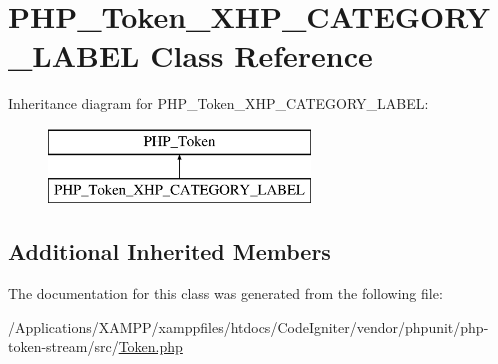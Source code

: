 \hypertarget{class_p_h_p___token___x_h_p___c_a_t_e_g_o_r_y___l_a_b_e_l}{}\section{P\+H\+P\+\_\+\+Token\+\_\+\+X\+H\+P\+\_\+\+C\+A\+T\+E\+G\+O\+R\+Y\+\_\+\+L\+A\+B\+EL Class Reference}
\label{class_p_h_p___token___x_h_p___c_a_t_e_g_o_r_y___l_a_b_e_l}
Inheritance diagram for P\+H\+P\+\_\+\+Token\+\_\+\+X\+H\+P\+\_\+\+C\+A\+T\+E\+G\+O\+R\+Y\+\_\+\+L\+A\+B\+EL\+:\begin{figure}[H]
\begin{center}
\leavevmode
\includegraphics[height=2.000000cm]{class_p_h_p___token___x_h_p___c_a_t_e_g_o_r_y___l_a_b_e_l}
\end{center}
\end{figure}
\subsection*{Additional Inherited Members}


The documentation for this class was generated from the following file\+:\begin{DoxyCompactItemize}
\item 
/\+Applications/\+X\+A\+M\+P\+P/xamppfiles/htdocs/\+Code\+Igniter/vendor/phpunit/php-\/token-\/stream/src/\mbox{\hyperlink{_token_8php}{Token.\+php}}\end{DoxyCompactItemize}
